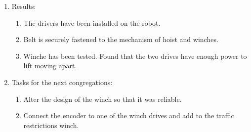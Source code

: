 \begin{enumerate}
\begin{enumerate}
    \end{enumerate}
    
	\item Results: 
	\begin{enumerate}
	  \item	The drivers have been installed on the robot.
	  
	  \item	Belt is securely fastened to the mechanism of hoist and winches.
	  
	  \item	Winche has been tested. Found that the two drives have enough power to lift moving apart.
	  
    \end{enumerate}
    
	\item Tasks for the next congregations:
	\begin{enumerate}
	  \item	Alter the design of the winch so that it was reliable.
	  
	  \item Connect the encoder to one of the winch drives and add to the traffic restrictions winch.
	  
    \end{enumerate}     
\end{enumerate}
\fillpage
